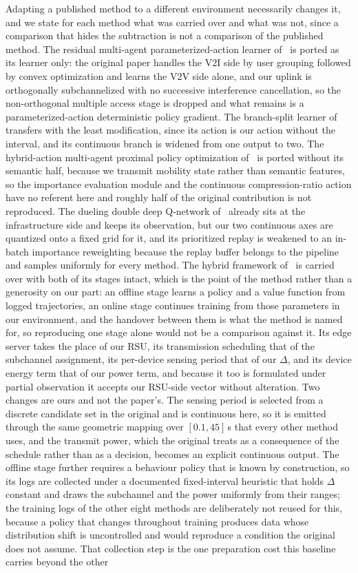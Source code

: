 \documentclass[journal]{IEEEtran}
\begin{document}
Adapting a published method to a different environment necessarily changes it, and we state for each method what was carried over and what was not, since a comparison that hides the subtraction is not a comparison of the published method. The residual multi-agent parameterized-action learner of~\cite{li2026} is ported as its learner only: the original paper handles the V2I side by user grouping followed by convex optimization and learns the V2V side alone, and our uplink is orthogonally subchannelized with no successive interference cancellation, so the non-orthogonal multiple access stage is dropped and what remains is a parameterized-action deterministic policy gradient. The branch-split learner of~\cite{hong2026} transfers with the least modification, since its action is our action without the interval, and its continuous branch is widened from one output to two. The hybrid-action multi-agent proximal policy optimization of~\cite{chen2026} is ported without its semantic half, because we transmit mobility state rather than semantic features, so the importance evaluation module and the continuous compression-ratio action have no referent here and roughly half of the original contribution is not reproduced. The dueling double deep Q-network of~\cite{bai2024} already sits at the infrastructure side and keeps its observation, but our two continuous axes are quantized onto a fixed grid for it, and its prioritized replay is weakened to an in-batch importance reweighting because the replay buffer belongs to the pipeline and samples uniformly for every method. The hybrid framework of~\cite{xu2026} is carried over with both of its stages intact, which is the point of the method rather than a generosity on our part: an offline stage learns a policy and a value function from logged trajectories, an online stage continues training from those parameters in our environment, and the handover between them is what the method is named for, so reproducing one stage alone would not be a comparison against it. Its edge server takes the place of our RSU, its transmission scheduling that of the subchannel assignment, its per-device sensing period that of our $\Delta$, and its device energy term that of our power term, and because it too is formulated under partial observation it accepts our RSU-side vector without alteration. Two changes are ours and not the paper's. The sensing period is selected from a discrete candidate set in the original and is continuous here, so it is emitted through the same geometric mapping over $[0.1, 45]$\,s that every other method uses, and the transmit power, which the original treats as a consequence of the schedule rather than as a decision, becomes an explicit continuous output. The offline stage further requires a behaviour policy that is known by construction, so its logs are collected under a documented fixed-interval heuristic that holds $\Delta$ constant and draws the subchannel and the power uniformly from their ranges; the training logs of the other eight methods are deliberately not reused for this, because a policy that changes throughout training produces data whose distribution shift is uncontrolled and would reproduce a condition the original does not assume. That collection step is the one preparation cost this baseline carries beyond the other 
\end{document}
